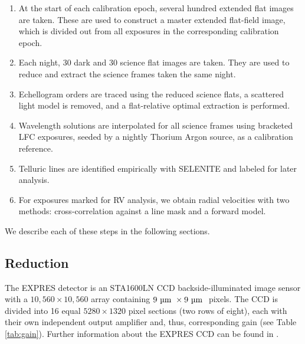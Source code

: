\begin{enumerate}
\tightlist
\item At the start of each calibration epoch, several hundred extended flat images are taken. These are used to construct a master extended flat-field image, which is divided out from all exposures in the corresponding calibration epoch.
\item Each night, 30 dark and 30 science flat images are taken. They are used to reduce and extract the science frames taken the same night.
\item Echellogram orders are traced using the reduced science flats, a scattered light model is removed, and a flat-relative optimal extraction is performed. 
\item Wavelength solutions are interpolated for all science frames using bracketed LFC exposures, seeded by a nightly Thorium Argon source, as a calibration reference.
\item Telluric lines are identified empirically with SELENITE \citep{leet_toward_2019} and labeled for later analysis.
\item For exposures marked for RV analysis, we obtain radial velocities with two methods: cross-correlation against a line mask and a forward model.
\end{enumerate}

We describe each of these steps in the following sections.

\hypertarget{reduction}{%
\subsection{Reduction}\label{reduction}}

The EXPRES detector is an STA1600LN CCD backside-illuminated image sensor with a $10,560 \times 10,560$ array containing $9 ~\si{\micro\meter}~ \times 9 ~\si{\micro\meter}~$ pixels. The CCD is divided into 16 equal $5280 \times 1320$ pixel sections (two rows of eight), each with their own independent output amplifier and, thus, corresponding gain (see Table \ref{tab:gain}). Further information about the EXPRES CCD can be found in \citet{blackman_performance_2020}.

